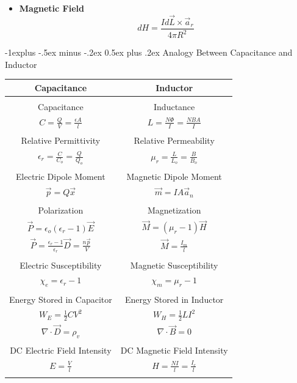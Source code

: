 \documentclass[10pt,landscape]{article}
\makeatletter
\renewcommand{\subsection}{\@startsection{subsection}{2}{0mm}%
                                {-1explus -.5ex minus -.2ex}%
                                {0.5ex plus .2ex}%
                                {\normalfont\normalsize\bfseries}}
\makeatother
\begin{document}
\begin{multicols*}{3}
\begin{itemize}
\item \textbf{Magnetic Field}
$$dH = \frac{Id\vec{L} \times \vec{a}_r}{4\pi R^2}$$
\end{itemize}
\subsection{Analogy Between Capacitance and Inductor}
   \begin{center}
    \begin{tabular}{c|c}
        \textbf{Capacitance}  & \textbf{Inductor}  \\
        \hline \\
        Capacitance & Inductance \\
        $C=\frac{Q}{V} = \frac{\epsilon A}{l}$ & $L=\frac{N\Phi}{I} = \frac{NBA}{I}$  \\ \\ Relative Permittivity &  Relative Permeability \\
        $\epsilon_r = \frac{C}{C_o} = \frac{Q}{Q_o}$ & $\mu_r = \frac{L}{L_o} = \frac{B}{B_o}$\\ \\
        Electric Dipole Moment & Magnetic Dipole Moment  \\ 
        $\vec{p} = Q\vec{x}$ & $\vec{m} = IA\vec{a}_n$ \\ \\
        Polarization & Magnetization \\
        $\vec{P} = \epsilon_o (\epsilon_r - 1) \vec{E} $ &  $\vec{M} = (\mu_r - 1) \vec{H}$ \\ 
        $\vec{P} = \frac{\epsilon_r-1}{\epsilon_r} \vec{D} = \frac{n \vec{p}}{V}$ &  $\vec{M} = \frac{I_m}{l}$ \\ \\
        Electric Susceptibility  & Magnetic Susceptibility \\
        $\chi_e =  \epsilon_r - 1$ & $\chi_m =  \mu_r - 1$ \\ \\
        Energy Stored in Capacitor & Energy Stored in Inductor \\ 
        $W_E = \frac{1}{2} CV^2$ & $W_H = \frac{1}{2} LI^2$ \\ 
        $\nabla \cdot \vec{D} = \rho_v$ & $\nabla \cdot \vec{B} = 0$ \\ \\
        DC Electric Field Intensity & DC Magnetic Field Intensity \\
        $E = \frac{V}{l}$ & $H = \frac{NI}{l} = \frac{I_c}{l}$ \\ \\

\end{tabular}
\end{center}
\end{multicols*}
\end{document}
